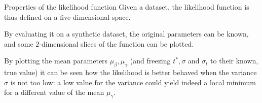 \documentclass{beamer}
\begin{document}
\begin{frame}{Properties of the likelihood function}
  Given a dataset, the likelihood function is thus defined on a five-dimensional space.

  By evaluating it on a synthetic dataset, the original parameters can be known,
  and some 2-dimensional slices of the function can be plotted.

  By plotting the mean parameters \(\mu_\beta, \mu_\gamma\) (and freezing \(t^*, \sigma\) and \(\sigma_t\) to their known, true value) it can be seen how the likelihood is better behaved when the variance \(\sigma\) is not too low:
a low value for the variance could yield indeed a local minimum for a different value of the mean \(\mu_\gamma\).
  
\end{frame}
\end{document}
